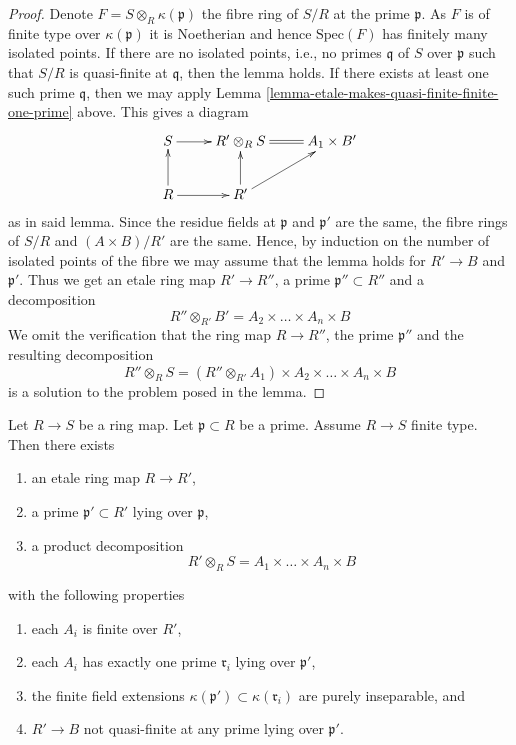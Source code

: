 \begin{proof}
Denote $F = S \otimes_R \kappa(\mathfrak p)$ the fibre ring of $S/R$
at the prime $\mathfrak p$. As $F$ is of finite type over $\kappa(\mathfrak p)$
it is Noetherian and hence $\text{Spec}(F)$ has finitely many isolated
points. If there are no isolated points,
i.e., no primes $\mathfrak q$ of $S$ over $\mathfrak p$ such that
$S/R$ is quasi-finite at $\mathfrak q$, then the lemma holds.
If there exists at least one such prime $\mathfrak q$, then
we may apply Lemma \ref{lemma-etale-makes-quasi-finite-finite-one-prime} above.
This gives a diagram
$$
\xymatrix{
S \ar[r] & R'\otimes_R S \ar@{=}[r] & A_1 \times B' \\
R \ar[r] \ar[u] & R' \ar[u] \ar[ru]
}
$$
as in said lemma. Since the residue fields at $\mathfrak p$ and $\mathfrak p'$
are the same, the fibre rings of $S/R$ and $(A \times B)/R'$
are the same. Hence, by induction on the number of isolated points
of the fibre we may assume that the lemma holds for
$R' \to B$ and $\mathfrak p'$. Thus we get an etale ring
map $R' \to R''$, a prime $\mathfrak p'' \subset R''$ and
a decomposition
$$
R'' \otimes_{R'} B' = A_2 \times \ldots \times A_n \times B
$$
We omit the verification that the ring map $R \to R''$, the
prime $\mathfrak p''$ and the resulting decomposition
$$
R'' \otimes_R S = (R'' \otimes_{R'} A_1) \times
A_2 \times \ldots \times A_n \times B
$$
is a solution to the problem posed in the lemma.
\end{proof}

\begin{lemma}
\label{lemma-etale-makes-quasi-finite-finite-variant}
Let $R \to S$ be a ring map.
Let $\mathfrak p \subset R$ be a prime.
Assume $R \to S$ finite type.
Then there exists
\begin{enumerate}
\item an etale ring map $R \to R'$,
\item a prime $\mathfrak p' \subset R'$ lying over $\mathfrak p$,
\item a product decomposition
$$
R' \otimes_R S = A_1 \times \ldots \times A_n \times B
$$
\end{enumerate}
with the following properties
\begin{enumerate}
\item each $A_i$ is finite over $R'$,
\item each $A_i$ has exactly one prime $\mathfrak r_i$ lying over
$\mathfrak p'$,
\item the finite field extensions
$\kappa(\mathfrak p') \subset \kappa(\mathfrak r_i)$
are purely inseparable, and
\item $R' \to B$ not quasi-finite at any prime lying over $\mathfrak p'$.
\end{enumerate}
\end{lemma}

